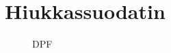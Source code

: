 \chapter{Hiukkassuodatin}%
\label{ch:dpf}

\begin{figure}[H]
    \centering 
    
    \caption{DPF}
    \label{fig:wall-flow-dpf}
\end{figure}